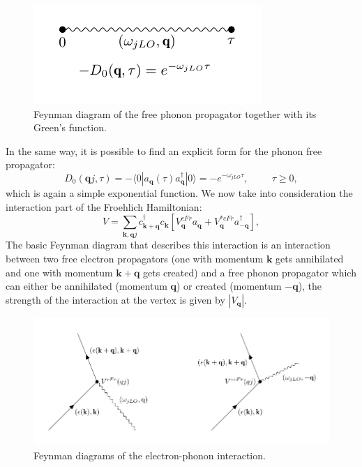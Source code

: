 \documentclass[12pt, a4paper]{report}
\numberwithin{equation}{section}
\begin{document}
\begin{figure}[H]
    \centering
    \includegraphics[scale=1.5]{free_ph_propagator.pdf}
    \caption{Feynman diagram of the free phonon propagator together with its Green's function.}
    \label{fig:ph_prop_free}
\end{figure}
In the same way, it is possible to find an explicit form for the phonon free propagator:
\begin{equation}
    D_0(\mathbf{q}j,\tau)=-\langle 0|a_\mathbf{q}(\tau)a^\dagger_\mathbf{q}|0\rangle=-e^{-\omega_{jLO}\tau},\hspace{1cm}\tau\ge0,
\end{equation}
which is again a simple exponential function.
We now take into consideration the interaction part of the Froehlich Hamiltonian:
\begin{equation}
    V=\sum_{\mathbf{k},\mathbf{q}j}c^\dagger_{\mathbf{k+q}}c_{\mathbf{k}}\left[V^{cFr}_\mathbf{q}a_\mathbf{q}+V^{*cFr}_\mathbf{q}a^\dagger_\mathbf{-q}\right],
    \label{polaron_interacting}
\end{equation}
The basic Feynman diagram that describes this interaction is an interaction between two free electron propagators (one with momentum 
$\mathbf{k}$ gets annihilated and one with momentum $\mathbf{k+q}$ gets created) and a free phonon propagator which can either be annihilated (momentum 
$\mathbf{q}$) or created (momentum $\mathbf{-q}$), the strength of the interaction at the vertex is given by $|V_\mathbf{q}|$.
\begin{figure}[H]
    \centering
    \includegraphics[scale=1]{interaction_vertex.pdf}
    \caption{Feynman diagrams of the electron-phonon interaction.}
    \label{fig:interaction_vertex}
\end{figure}
\end{document}
